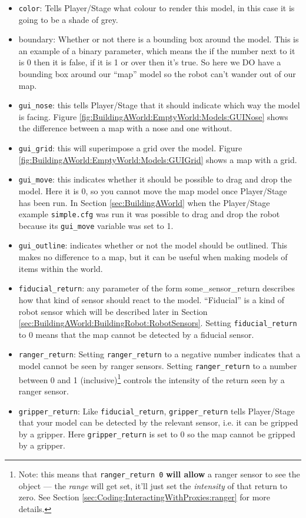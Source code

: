 \documentclass[a4paper]{report}
\newcommand{\plst}{Player/Stage\xspace}
\begin{document}
\begin{itemize}
\item \verb|color|: Tells \plst what colour to render this model, in this case it is going to be a shade of grey. 
\item boundary: Whether or not there is a bounding box around the model. This is an example of a binary parameter, which means the if the number next to it is 0 then it is false, if it is 1 or over then it's true. So here we DO have a bounding box around our ``map'' model so the robot can't wander out of our map.
\item \verb|gui_nose|: this tells \plst that it should indicate which way the model is facing. Figure \ref{fig:BuildingAWorld:EmptyWorld:Models:GUINose} shows the difference between a map with a nose and one without.
\item \verb|gui_grid|: this will superimpose a grid over the model. Figure \ref{fig:BuildingAWorld:EmptyWorld:Models:GUIGrid} shows a map with a grid.
\item \verb|gui_move|: this indicates whether it should be possible to drag and drop the model. Here it is 0, so you cannot move the map model once \plst has been run. In Section \ref{sec:BuildingAWorld} when the \plst example \verb|simple.cfg| was run it was possible to drag and drop the robot because its \verb|gui_move| variable was set to 1.
\item \verb|gui_outline|: indicates whether or not the model should be outlined. This makes no difference to a map, but it can be useful when making models of items within the world.
\item \verb|fiducial_return|: any parameter of the form some\_sensor\_return describes how that kind of sensor should react to the model. ``Fiducial'' is a kind of robot sensor which will be described later in Section \ref{sec:BuildingAWorld:BuildingRobot:RobotSensors}. Setting \verb|fiducial_return| to 0 means that the map cannot be detected by a fiducial sensor.
\item \verb|ranger_return|: Setting \verb|ranger_return| to a negative
      number indicates that a model cannot be seen by ranger sensors.
      Setting \verb|ranger_return| to a number between 0 and 1
      (inclusive)\footnote{Note: this means that {\tt ranger\_return 0}  
      {\bf will allow} a ranger sensor to see the object --- the {\em
      range} will get set, it'll just set the {\em intensity} of that return
      to zero.  See Section \ref{sec:Coding:InteractingWithProxies:ranger}
      for more details.}
      controls the intensity of the return seen by a ranger sensor.
\item \verb|gripper_return|: Like \verb|fiducial_return|, \verb|gripper_return| tells \plst that your model can be detected by the relevant sensor, i.e. it can be gripped by a gripper. Here \verb|gripper_return| is set to 0 so the map cannot be gripped by a gripper. 
\end{itemize}
\end{document}
